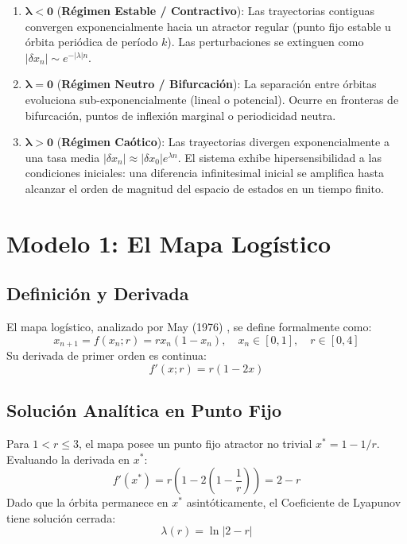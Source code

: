 \documentclass[11pt,letterpaper]{article}
\theoremstyle{definition}
\begin{document}
\begin{enumerate}
    \item $\boldsymbol{\lambda < 0}$ (\textbf{Régimen Estable / Contractivo}): Las trayectorias contiguas convergen exponencialmente hacia un atractor regular (punto fijo estable u órbita periódica de período $k$). Las perturbaciones se extinguen como $|\delta x_n| \sim e^{-|\lambda| n}$.
    \item $\boldsymbol{\lambda = 0}$ (\textbf{Régimen Neutro / Bifurcación}): La separación entre órbitas evoluciona sub-exponencialmente (lineal o potencial). Ocurre en fronteras de bifurcación, puntos de inflexión marginal o periodicidad neutra.
    \item $\boldsymbol{\lambda > 0}$ (\textbf{Régimen Caótico}): Las trayectorias divergen exponencialmente a una tasa media $|\delta x_n| \approx |\delta x_0| e^{\lambda n}$. El sistema exhibe hipersensibilidad a las condiciones iniciales: una diferencia infinitesimal inicial se amplifica hasta alcanzar el orden de magnitud del espacio de estados en un tiempo finito.
\end{enumerate}

\section{Modelo 1: El Mapa Logístico}

\subsection{Definición y Derivada}
El mapa logístico, analizado por May (1976) \cite{may1976}, se define formalmente como:
\begin{equation}
    x_{n+1} = f(x_n; r) = r x_n (1 - x_n), \quad x_n \in [0, 1], \quad r \in [0, 4]
\end{equation}
Su derivada de primer orden es continua:
\begin{equation}
    f'(x; r) = r (1 - 2x)
\end{equation}

\subsection{Solución Analítica en Punto Fijo}
Para $1 < r \le 3$, el mapa posee un punto fijo atractor no trivial $x^* = 1 - 1/r$. Evaluando la derivada en $x^*$:
\begin{equation}
    f'(x^*) = r\left(1 - 2\left(1 - \frac{1}{r}\right)\right) = 2 - r
\end{equation}
Dado que la órbita permanece en $x^*$ asintóticamente, el Coeficiente de Lyapunov tiene solución cerrada:
\begin{equation}
    \lambda(r) = \ln |2 - r|
    \label{eq:lambda_logistic_fixed}
\end{equation}
\end{document}
